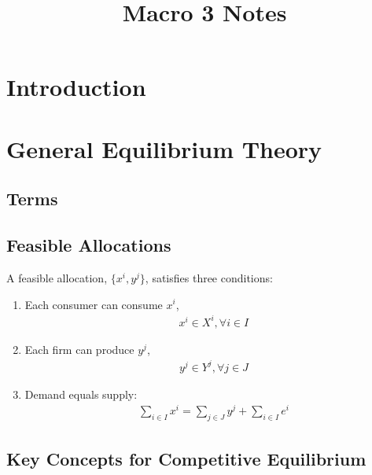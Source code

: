 \documentclass[10pt]{article}
\title{Macro 3 Notes}
\author{}
\date{}
\begin{document}
\maketitle

\tableofcontents

\section{Introduction}

\section{General Equilibrium Theory}

\subsection{Terms}



\subsection{Feasible Allocations}

\begin{definition} 
    
    A feasible allocation, $\{x^i, y^j\}$, satisfies three conditions:

    \begin{enumerate}
        \item Each consumer can consume $x^i$, 
            \begin{align}
                x^i \in X^i, \forall i \in I
            \end{align}
        \item Each firm can produce $y^j$,
            \begin{align}
                y^j \in Y^j, \forall j \in J
            \end{align}
        \item Demand equals supply:
            \begin{align}
                \sum_{i \in I} x^i=\sum_{j \in J} y^j + \sum_{i \in I} e^i
            \end{align}
    \end{enumerate}

\end{definition}

\subsection{Key Concepts for Competitive Equilibrium}
\end{document}
